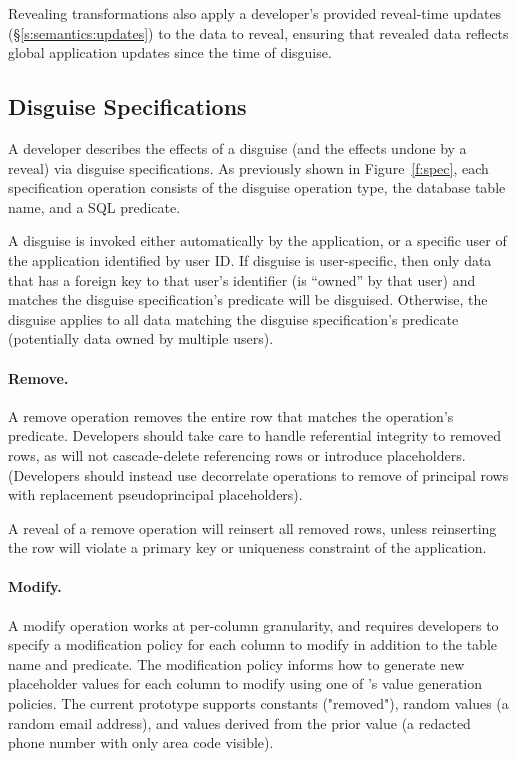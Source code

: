 %
Revealing transformations also apply a developer's provided reveal-time updates
(\S\ref{s:semantics:updates}) to the data to reveal, ensuring that revealed data reflects global
application updates since the time of disguise.
%

\subsection{Disguise Specifications}
\label{s:spec}

%
A developer describes the effects of a disguise (and the effects undone by a
reveal) via disguise specifications.  As previously shown in
Figure~\ref{f:spec}, each specification operation consists of the disguise
operation type, the database table name, 
and a SQL  predicate.

%
A disguise is invoked either automatically by the application, or a specific
user of the application identified by user ID. 
% 
If disguise is user-specific, then only data that has a foreign key to that
user's identifier (is ``owned'' by that user) and matches the disguise
specification's predicate will be disguised.  Otherwise, the disguise applies to
all data matching the disguise specification's predicate (potentially data owned
by multiple users).  
%

\paragraph{Remove.}
A remove operation removes the entire row that matches the operation's
predicate.
%
Developers should take care to handle referential integrity to removed rows, as
\sys will not cascade-delete referencing rows or introduce placeholders.
(Developers should instead use decorrelate operations to remove of principal
rows with replacement pseudoprincipal placeholders).
%

%
A reveal of a remove operation will reinsert all removed rows, unless
reinserting the row will violate a primary key or uniqueness constraint of the
application.
%

%
\paragraph{Modify.}
A modify operation works at per-column granularity, and requires developers to
specify a modification policy for each column to modify in addition to the table
name and predicate.
%
The modification policy informs \sys how to generate new placeholder values for
each column to modify using one of \sys's value generation policies. The current
prototype supports constants (\eg "removed"), random values (\eg a random email
address), and values derived from the prior value (\eg a redacted phone number
with only area code visible).
%


